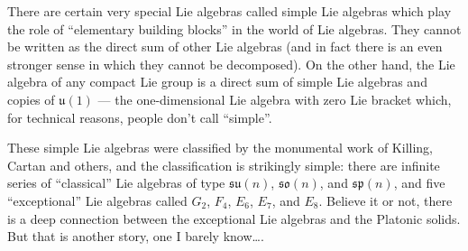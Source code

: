 \documentclass{article}
\begin{document}
There are certain very special Lie algebras called simple Lie algebras
which play the role of ``elementary building blocks'' in the world of
Lie algebras. They cannot be written as the direct sum of other Lie
algebras (and in fact there is an even stronger sense in which they
cannot be decomposed). On the other hand, the Lie algebra of any compact
Lie group is a direct sum of simple Lie algebras and copies of
\(\mathfrak{u}(1)\) --- the one-dimensional Lie algebra with zero Lie
bracket which, for technical reasons, people don't call ``simple''.

These simple Lie algebras were classified by the monumental work of
Killing, Cartan and others, and the classification is strikingly simple:
there are infinite series of ``classical'' Lie algebras of type
\(\mathfrak{su}(n)\), \(\mathfrak{so}(n)\), and \(\mathfrak{sp}(n)\),
and five ``exceptional'' Lie algebras called \(G_2\), \(F_4\), \(E_6\),
\(E_7\), and \(E_8\). Believe it or not, there is a deep connection
between the exceptional Lie algebras and the Platonic solids. But that
is another story, one I barely know\ldots.
\end{document}

